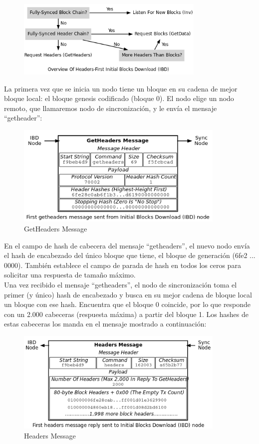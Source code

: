 \documentclass[11pt,a4paper]{article}
\begin{document}
\begin{figure}[h]
	\includegraphics[width=9cm]{Image1.png}
	\centering		
	\caption{}
	\label{p5}
\end{figure}

La primera vez que se inicia un nodo tiene un bloque en su cadena de mejor bloque local: el bloque genesis codificado (bloque 0). El nodo elige un nodo remoto, que llamaremos nodo de sincronización, y le envía el mensaje ``getheader'':\\

\begin{figure}[h]
	\includegraphics[width=10cm]{Image2.png}
	\centering		
	\caption{GetHeaders Message}
	\label{p5}
\end{figure}

En el campo de hash de cabecera del mensaje ``getheaders'', el nuevo nodo envía el hash de encabezado del único bloque que tiene, el bloque de generación (6fe2 ... 0000). También establece el campo de parada de hash en todos los ceros para solicitar una respuesta de tamaño máximo.\\

Una vez recibido el mensaje ``getheaders'', el nodo de sincronización toma el primer (y único) hash de encabezado y busca en su mejor cadena de bloque local un bloque con ese hash. Encuentra que el bloque 0 coincide, por lo que responde con un 2.000 cabeceras (respuesta máxima) a partir del bloque 1. Los hashes de estas cabeceras los manda en el mensaje mostrado a continuación:\\
\begin{figure}[h]
	\includegraphics[width=10cm]{Image3.png}
	\centering		
	\caption{Headers Message}
	\label{p5}
\end{figure}
\end{document}
